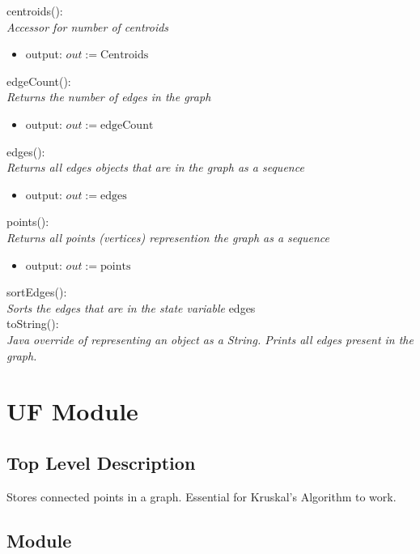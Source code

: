 \documentclass[12pt]{article}
\begin{document}
\noindent
centroids():\\
\textit{Accessor for number of centroids}
\begin{itemize}
\item output: $out := \mbox{Centroids}$
\end{itemize}

\noindent
edgeCount():\\
\textit{Returns the number of edges in the graph}
\begin{itemize}
\item output: $out := \mbox{edgeCount}$
\end{itemize}

\noindent
edges():\\
\textit{Returns all edges objects that are in the graph as a sequence}
\begin{itemize}
\item output: $out := \mbox{edges}$
\end{itemize}

\noindent
points():\\
\textit{Returns all points (vertices) represention the graph as a sequence}
\begin{itemize}
\item output: $out := \mbox{points}$
\end{itemize}

\noindent
sortEdges():\\
\textit{Sorts the edges that are in the state variable} edges\\


\noindent
toString():\\
\textit{Java override of representing an object as a String. Prints all edges
present in the graph.}


\newpage


\section*{UF Module}

\subsection* {Top Level Description}

Stores connected points in a graph. Essential for Kruskal's Algorithm to work.

\subsection*{Module}
\end{document}

